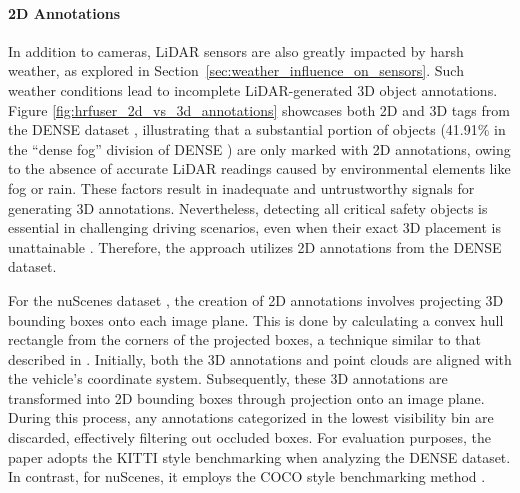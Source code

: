 \documentclass[report.tex]{subfiles}
\begin{document}
    \paragraph*{2D Annotations}
    
    In addition to cameras, LiDAR sensors are also greatly impacted by harsh weather, as explored in Section~\ref{sec:weather_influence_on_sensors}. Such weather conditions lead to incomplete LiDAR-generated 3D object annotations. Figure \ref{fig:hrfuser_2d_vs_3d_annotations} showcases both 2D and 3D tags from the DENSE dataset \cite{bijelic2020seeing}, illustrating that a substantial portion of objects (41.91\% in the “dense fog” division of DENSE \cite{bijelic2020seeing}) are only marked with 2D annotations, owing to the absence of accurate LiDAR readings caused by environmental elements like fog or rain. These factors result in inadequate and untrustworthy signals for generating 3D annotations. Nevertheless, detecting all critical safety objects is essential in challenging driving scenarios, even when their exact 3D placement is unattainable \cite{broedermann2022hrfuser}. Therefore, the approach utilizes 2D annotations from the DENSE dataset. 
    
    For the nuScenes dataset \cite{caesar2020nuscenes}, the creation of 2D annotations involves projecting 3D bounding boxes onto each image plane. This is done by calculating a convex hull rectangle from the corners of the projected boxes, a technique similar to that described in \cite{nabati2020Radar}. Initially, both the 3D annotations and point clouds are aligned with the vehicle's coordinate system. Subsequently, these 3D annotations are transformed into 2D bounding boxes through projection onto an image plane. During this process, any annotations categorized in the lowest visibility bin are discarded, effectively filtering out occluded boxes. For evaluation purposes, the paper adopts the KITTI style benchmarking \cite{geiger2012we} when analyzing the DENSE dataset. In contrast, for nuScenes, it employs the COCO style benchmarking method \cite{lin2014microsoft}.
\end{document}
